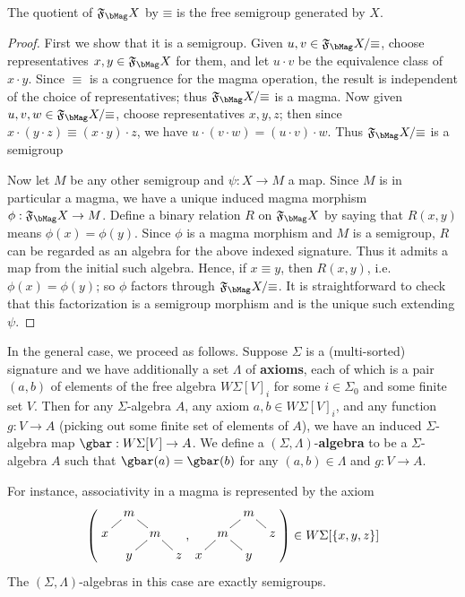\documentclass{book}
\def\sig{\Sigma}
\def\axes{\Lambda}
\def\equivsym{\mathord{\equiv}}
\newcommand{\F}[1]{\mathfrak{F}_{#1}}
\begin{document}
\begin{thm}\label{thm:free-monoid}
  The quotient of $\F\bMag X$ by $\equivsym$ is the free semigroup generated by $X$.
\end{thm}
\begin{proof}
  First we show that it is a semigroup.
  Given $u,v\in\F\bMag X/\equivsym$, choose representatives $x,y\in\F\bMag X$ for them, and let $u\cdot v$ be the equivalence class of $x\cdot y$.
  Since $\equiv$ is a congruence for the magma operation, the result is independent of the choice of representatives; thus $\F\bMag X/\equivsym$ is a magma.
  Now given $u,v,w \in \F\bMag X/\equivsym$, choose representatives $x,y,z$; then since $x\cdot (y\cdot z)\equiv (x\cdot y)\cdot z$, we have $u\cdot (v\cdot w) =  (u\cdot v)\cdot w$.
  Thus $\F\bMag X/\equivsym$ is a semigroup

  Now let $M$ be any other semigroup and $\psi:X\to M$ a map.
  Since $M$ is in particular a magma, we have a unique induced magma morphism $\phi : \F\bMag X\to M$.
  Define a binary relation $R$ on $\F\bMag X$ by saying that $R(x,y)$ means $\phi(x)=\phi(y)$.
  Since $\phi$ is a magma morphism and $M$ is a semigroup, $R$ can be regarded as an algebra for the above indexed signature.
  Thus it admits a map from the initial such algebra.
  Hence, if $x\equiv y$, then $R(x,y)$, i.e.\ $\phi(x)=\phi(y)$; so $\phi$ factors through $\F\bMag X/\equivsym$.
  It is straightforward to check that this factorization is a semigroup morphism and is the unique such extending $\psi$.
\end{proof}

In the general case, we proceed as follows.
Suppose $\sig$ is a (multi-sorted) signature and we have additionally a set $\axes$ of \textbf{axioms}, each of which is a pair $(a,b)$ of elements of the free algebra $W\sig[V]_i$ for some $i\in\sig_0$ and some finite set $V$.
Then for any $\sig$-algebra $A$, any axiom $a,b\in W\sig[V]_i$, and any function $g:V\to A$ (picking out some finite set of elements of $A$), we have an induced $\sig$-algebra map $\gbar:W\sig[V]\to A$.
We define a $(\sig,\axes)$-\textbf{algebra} to be a $\sig$-algebra $A$ such that $\gbar(a)=\gbar(b)$ for any $(a,b)\in\axes$ and $g:V\to A$.

For instance, associativity in a magma is represented by the axiom
\[ \left(
  \vcenter{\xymatrix@-1.5pc{ & m \ar@{-}[dl] \ar@{-}[dr] \\ x && m \ar@{-}[dl] \ar@{-}[dr] \\ & y && z }},
  \vcenter{\xymatrix@-1.5pc{ && m \ar@{-}[dl] \ar@{-}[dr] \\ & m \ar@{-}[dl] \ar@{-}[dr] && z \\ x && y }}
\right)
\in W\sig[\{x,y,z\}]
\]
The $(\sig,\axes)$-algebras in this case are exactly semigroups.
\end{document}
